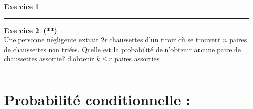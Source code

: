 \documentclass[a4paper,11pt]{article}
\theoremstyle{definition}
\newtheorem{exo}{Exercice} %
\begin{document}
\begin{minipage}{1\linewidth}
\begin{minipage}[c]{0.48\linewidth}
\begin{exo}
			\centering\rule{1\linewidth}{0.6pt}\end{exo}
		
		
		\begin{exo}\textbf{(**)}\quad\\[0.2cm]
			Une personne négligente extrait $2 r$ chaussettes d'un tiroir où se trouvent $n$ paires de chaussettes non triées. Quelle est la probabilité de n'obtenir aucune paire de chaussettes assortie? d'obtenir $k \leq r$ paires assorties
			
			\centering\rule{1\linewidth}{0.6pt}\end{exo}
		
		
\end{minipage}\end{minipage} 
			


\section*{Probabilité conditionnelle :}\hfill\\%
\end{document}
